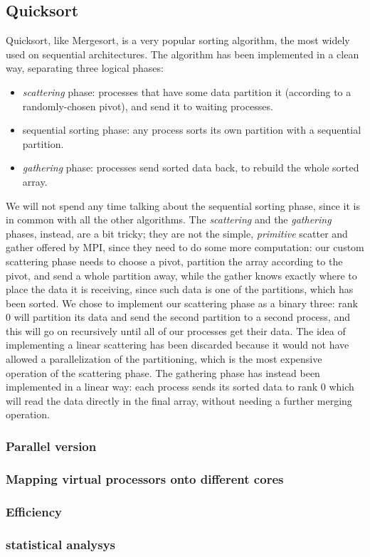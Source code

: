 \subsection{Quicksort}
Quicksort, like Mergesort, is a very popular sorting algorithm, the most widely used on sequential architectures. The algorithm has been implemented in a clean way, separating three logical phases:
\begin{itemize}
	\item{\textit{scattering} phase: processes that have some data partition it (according to a randomly-chosen pivot), and send it to waiting processes.}
	\item{sequential sorting phase: any process sorts its own partition with a sequential partition.}
	\item{\textit{gathering} phase: processes send sorted data back, to rebuild the whole sorted array.}
\end{itemize}
We will not spend any time talking about the sequential sorting phase, since it is in common with all the other algorithms.
The \textit{scattering} and the \textit{gathering} phases, instead, are a bit tricky; they are not the simple, \textit{primitive} scatter and gather offered by MPI, since they need to do some more computation: our custom scattering phase needs to choose a pivot, partition the array according to the pivot, and send a whole partition away, while the gather knows exactly where to place the data it is receiving, since such data is one of the partitions, which has been sorted.
We chose to implement our scattering phase as a binary three: rank 0 will partition its data and send the second partition to a second process, and this will go on recursively until all of our processes get their data. The idea of implementing a linear scattering has been discarded because it would not have allowed a parallelization of the partitioning, which is the most expensive operation of the scattering phase.
The gathering phase has instead been implemented in a linear way: each process sends its sorted data to rank 0 which will read the data directly in the final array, without needing a further merging operation.

\subsubsection*{Parallel version}
\subsubsection*{Mapping virtual processors onto different cores}  
\subsubsection*{Efficiency} 
\subsubsection*{statistical analysys}

